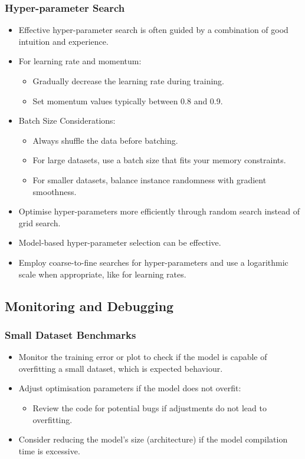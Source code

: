 \subsubsection*{Hyper-parameter Search}
\begin{itemize}
    \item Effective hyper-parameter search is often guided by a combination of good intuition and experience.
    \item For learning rate and momentum:
    \begin{itemize}
        \item Gradually decrease the learning rate during training.
        \item Set momentum values typically between 0.8 and 0.9.
    \end{itemize}
    \item Batch Size Considerations:
    \begin{itemize}
        \item Always shuffle the data before batching.
        \item For large datasets, use a batch size that fits your memory constraints.
        \item For smaller datasets, balance instance randomness with gradient smoothness.
    \end{itemize}
    \item Optimise hyper-parameters more efficiently through random search instead of grid search.
    \item Model-based hyper-parameter selection can be effective.
    \item Employ coarse-to-fine searches for hyper-parameters and use a logarithmic scale when appropriate, like for learning rates.
\end{itemize}

\subsection{Monitoring and Debugging}

\subsubsection*{Small Dataset Benchmarks}
\begin{itemize}
    \item Monitor the training error or plot to check if the model is capable of overfitting a small dataset, which is expected behaviour.
    \item Adjust optimisation parameters if the model does not overfit:
    \begin{itemize}
        \item Review the code for potential bugs if adjustments do not lead to overfitting.
    \end{itemize}
    \item Consider reducing the model's size (architecture) if the model compilation time is excessive.
\end{itemize}

